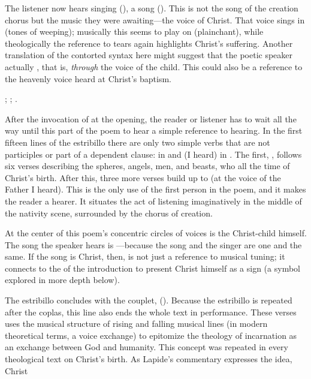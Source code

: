 The listener now hears singing (), a song ().
This is not the song of the creation chorus but the music they were
awaiting---the voice of Christ.
That voice sings in  (tones of weeping); musically
this seems to play on  (plainchant), while theologically the
reference to tears again highlights Christ's suffering.
Another translation of the contorted syntax here might suggest that the poetic
speaker actually , that is,
\emph{through} the voice of the child.
This could also be a reference to the heavenly voice heard at Christ's baptism.%
\begin{Footnote} 
    ; ; .
\end{Footnote}

After the invocation of  at the opening, the reader or listener
has to wait all the way until this part of the poem to hear a simple reference
to hearing.
In the first fifteen lines of the estribillo there are only two simple verbs
that are not participles or part of a dependent clause:  in
 and  (I heard) in .
The first, , follows six verses describing the spheres, angels,
men, and beasts, who all  the time of Christ's birth.
After this, three more verses build up to  (at the
voice of the Father I heard).
This is the only use of the first person in the poem, and it makes the reader a
hearer.
It situates the act of listening imaginatively in the middle of the nativity
scene, surrounded by the chorus of creation.

At the center of this poem's concentric circles of voices is the Christ-child
himself.
The song the speaker hears is ---because the song and the singer are one and the same.
If the song is Christ, then,  is not
just a reference to musical tuning; it connects to the  of the
introduction to present Christ himself as a sign (a symbol explored in more
depth below).

The estribillo concludes with the couplet,  ().
Because the estribillo is repeated after the coplas, this line also ends the
whole text in performance.
These verses uses the musical structure of rising and falling musical lines (in
modern theoretical terms, a voice exchange) to epitomize the theology of
incarnation as an exchange between God and humanity.
This concept was repeated in every theological text on Christ's birth.
As Lapide's commentary expresses the idea, Christ %
    \Autocite
    [670, on ; the quotation from Anselm is .]
    {Lapide:Gospels19C}

